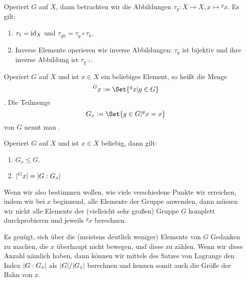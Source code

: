 \begin{lemma}[Offensichtliches]
Operiert $G$ auf $X$, dann betrachten wir die Abbildungen $\tau_g: X\to X, x\mapsto {^g x}$. Es gilt:
\begin{enumerate}
\item $\tau_1=\operatorname{id}_X$ und $\tau_{gh} =\tau_g\circ\tau_h$.
\item Inverse Elemente operieren wie inverse Abbildungen: $\tau_g$ ist bijektiv und ihre inverse Abbildung ist $\tau_{g^{-1}}$.
\end{enumerate}
\end{lemma}

\begin{definition}
Operiert $G$ auf $X$ und ist $x\in X$ ein beliebiges Element, so heißt die Menge
\[{^G x} := \Set{{^g x} | g\in G}\]
. Die Teilmenge
\[G_x := \Set{g\in G | {^g x} = x}\]
von $G$ nennt man .
\end{definition}

\begin{theorem}
Operiert $G$ auf $X$ und ist $x\in X$ beliebig, dann gilt:
\begin{enumerate}
\item $G_x\leq G$.
\item $\lvert^G x\rvert = \lvert G:G_x\rvert$
\end{enumerate}
\end{theorem}
\begin{remark}
Wenn wir also bestimmen wollen, wie viele verschiedene Punkte wir erreichen, indem wir bei $x$ beginnend, alle Elemente der Gruppe anwenden, dann müssen wir nicht alle Elemente der (vielleicht sehr großen) Gruppe $G$ komplett durchprobieren und jeweils ${^g x}$ berechnen.

Es genügt, sich über die (meistens deutlich weniger) Elemente von $G$ Gedanken zu machen, die $x$ überhaupt nicht bewegen, und diese zu zählen. Wenn wir diese Anzahl nämlich haben, dann können wir mittels des Satzes von Lagrange den Index $\lvert G:G_x\rvert$ als $\lvert G\rvert / \lvert G_x\rvert$ berechnen und kennen somit auch die Größe der Bahn von $x$.
\end{remark}

